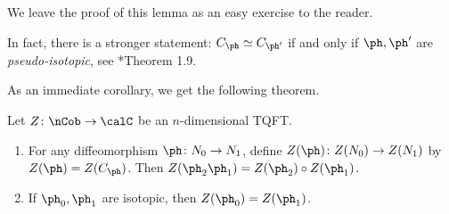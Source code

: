 We leave the proof of this lemma as an easy exercise to the reader.

\begin{remark}
  In fact, there is a stronger statement: $C_\ph\simeq C_{\ph'}$ if and only if
  $\ph, \ph'$ are \emph{pseudo-isotopic}, see
  *{Theorem 1.9}.
\end{remark}




As an immediate corollary, we get the following theorem.
\begin{theorem}\label{t:tqft-functoriality}
  Let $Z\colon \nCob\to \calC$ be an $n$-dimensional TQFT.
  \begin{enumerate}
    \item For any diffeomorphism $\ph\colon N_0\to N_1$, define
      $Z(\ph)\colon Z(N_0)\to Z(N_1)$ by $Z(\ph)=Z(C_\ph)$. Then
      $Z(\ph_2\ph_1)= Z(\ph_2)\circ Z(\ph_1)$.
    \item If $\ph_0,\ph_1$ are isotopic, then $Z(\ph_0)=Z(\ph_1)$.
  \end{enumerate}
\end{theorem}
\clearpage
